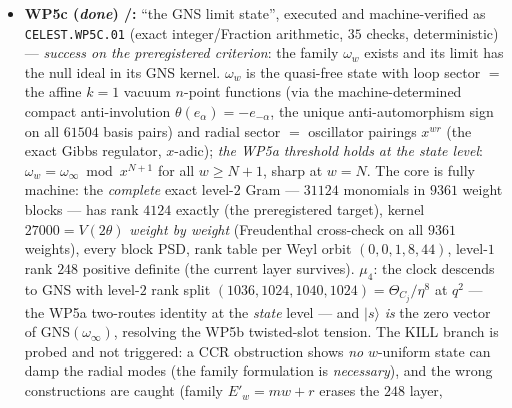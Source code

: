 \documentclass[11pt,a4paper]{article}
\begin{document}
\begin{itemize}
\begin{itemize}
controls separate honestly: the level-$1$ current state and generic level-$2$ states are \emph{not}
singular; at $k{=}2$ the \emph{cube} is (the $(E^\theta)^{k+1}$ pattern is generic Kac level
mechanics); $SO(16)_1$ has the same singular vector but keeps three extra level-$1$ primaries
($h=\tfrac12$ breaks one-block fusion) --- the singular-vector mechanism is level-$1$ \emph{generic},
the \emph{one-block closure} is the $E_8/\mu_4$-specific part. \emph{Handover to WP5c} (answered
below): in the twisted quarter-\emph{slot} moding of the $\chi_w$ limit Fock, two sector-$C_1$ modes
never sum to $8$ quarters (minimum $6=q^{3/2}$) --- the per-\emph{period} dictionary (\vref{v496}),
not the per-slot identification, carries $|s\rangle$ to $q^2$; exactly the GNS/limit-state question
(kernel $\supseteq$ ideal) that WP5c answers.
\item \textbf{WP5c (\emph{done}) \mE/\mC:} ``the GNS limit state'', executed and machine-verified as
\texttt{CELEST.WP5C.01}  (exact integer/Fraction
arithmetic, $35$ checks, deterministic) --- \emph{success on the preregistered criterion}: the family
$\omega_w$ exists and its limit has the null ideal in its GNS kernel. $\omega_w$ is the quasi-free
state with loop sector $=$ the affine $k{=}1$ vacuum $n$-point functions (via the machine-determined
compact anti-involution $\theta(e_\alpha)={-}e_{-\alpha}$, the unique anti-automorphism sign on all
$61504$ basis pairs) and radial sector $=$ oscillator pairings $x^{wr}$ (the exact Gibbs regulator,
$x$-adic); \emph{the WP5a threshold holds at the state level}: $\omega_w=\omega_\infty\bmod x^{N+1}$
for all $w\ge N{+}1$, sharp at $w=N$. The core is fully machine: the \emph{complete} exact level-$2$
Gram --- $31124$ monomials in $9361$ weight blocks --- has rank $4124$ exactly (the preregistered
target), kernel $27000=V(2\theta)$ \emph{weight by weight} (Freudenthal cross-check on all $9361$
weights), every block PSD, rank table per Weyl orbit $(0,0,1,8,44)$, level-$1$ rank $248$ positive
definite (the current layer survives). $\mu_4$: the clock descends to GNS with level-$2$ rank split
$(1036,1024,1040,1024)=\Theta_{C_j}/\eta^8$ at $q^2$ --- the WP5a two-routes identity at the
\emph{state} level --- and $|s\rangle$ \emph{is} the zero vector of GNS$(\omega_\infty)$, resolving
the WP5b twisted-slot tension. The KILL branch is probed and not triggered: a CCR obstruction shows
\emph{no} $w$-uniform state can damp the radial modes (the family formulation is \emph{necessary}),
and the wrong constructions are caught (family $E'_w=mw{+}r$ erases the $248$ layer,

\end{itemize}
\end{itemize}
\end{document}
